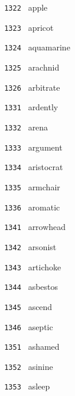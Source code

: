 \documentclass[11pt]{article}
\begin{document}
\begin{multicols}{6}
\noindent \texttt{ 1322 } \hspace{1mm} apple  \par
\noindent \texttt{ 1323 } \hspace{1mm} apricot  \par
\noindent \texttt{ 1324 } \hspace{1mm} aquamarine  \par
\noindent \texttt{ 1325 } \hspace{1mm} arachnid  \par
\noindent \texttt{ 1326 } \hspace{1mm} arbitrate  \par
\noindent \texttt{ 1331 } \hspace{1mm} ardently  \par
\noindent \texttt{ 1332 } \hspace{1mm} arena  \par
\noindent \texttt{ 1333 } \hspace{1mm} argument  \par
\noindent \texttt{ 1334 } \hspace{1mm} aristocrat  \par
\noindent \texttt{ 1335 } \hspace{1mm} armchair  \par
\noindent \texttt{ 1336 } \hspace{1mm} aromatic  \par
\noindent \texttt{ 1341 } \hspace{1mm} arrowhead  \par
\noindent \texttt{ 1342 } \hspace{1mm} arsonist  \par
\noindent \texttt{ 1343 } \hspace{1mm} artichoke  \par
\noindent \texttt{ 1344 } \hspace{1mm} asbestos  \par
\noindent \texttt{ 1345 } \hspace{1mm} ascend  \par
\noindent \texttt{ 1346 } \hspace{1mm} aseptic  \par
\noindent \texttt{ 1351 } \hspace{1mm} ashamed  \par
\noindent \texttt{ 1352 } \hspace{1mm} asinine  \par
\noindent \texttt{ 1353 } \hspace{1mm} asleep  \par

\end{multicols}
\end{document}
